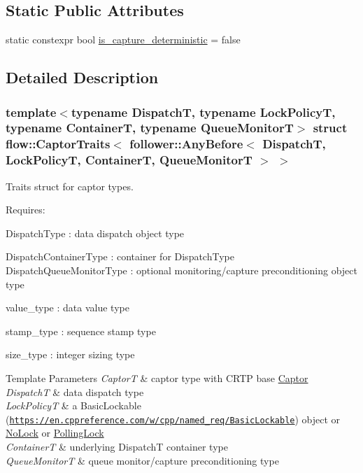 \subsection*{Static Public Attributes}
\begin{DoxyCompactItemize}
\item 
static constexpr bool \hyperlink{structflow_1_1_captor_traits_3_01follower_1_1_any_before_3_01_dispatch_t_00_01_lock_policy_t_00_55050b2eb17fc5bc754f0ec7f3a869fd_ae94a381cf76ac9f1a639c58570aa6350}{is\+\_\+capture\+\_\+deterministic} = false
\end{DoxyCompactItemize}


\subsection{Detailed Description}
\subsubsection*{template$<$typename DispatchT, typename Lock\+PolicyT, typename ContainerT, typename Queue\+MonitorT$>$\newline
struct flow\+::\+Captor\+Traits$<$ follower\+::\+Any\+Before$<$ Dispatch\+T, Lock\+Policy\+T, Container\+T, Queue\+Monitor\+T $>$ $>$}

Traits struct for captor types. 

Requires\+:
\begin{DoxyItemize}
\item {\ttfamily Dispatch\+Type} \+: data dispatch object type
\item {\ttfamily Dispatch\+Container\+Type} \+: container for {\ttfamily Dispatch\+Type} {\ttfamily Dispatch\+Queue\+Monitor\+Type} \+: optional monitoring/capture preconditioning object type
\item {\ttfamily value\+\_\+type} \+: data value type
\item {\ttfamily stamp\+\_\+type} \+: sequence stamp type
\item {\ttfamily size\+\_\+type} \+: integer sizing type
\end{DoxyItemize}


\begin{DoxyTemplParams}{Template Parameters}
{\em CaptorT} & captor type with C\+R\+TP base {\ttfamily \hyperlink{classflow_1_1_captor}{Captor}}\\
\hline
{\em DispatchT} & data dispatch type \\
\hline
{\em Lock\+PolicyT} & a Basic\+Lockable (\href{https://en.cppreference.com/w/cpp/named_req/BasicLockable}{\tt https\+://en.\+cppreference.\+com/w/cpp/named\+\_\+req/\+Basic\+Lockable}) object or \hyperlink{structflow_1_1_no_lock}{No\+Lock} or \hyperlink{structflow_1_1_polling_lock}{Polling\+Lock} \\
\hline
{\em ContainerT} & underlying {\ttfamily DispatchT} container type \\
\hline
{\em Queue\+MonitorT} & queue monitor/capture preconditioning type \\
\hline
\end{DoxyTemplParams}



